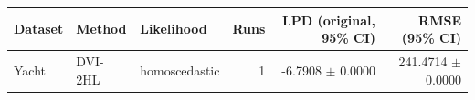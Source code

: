 \begin{tabular}{lllrrr}
\toprule
Dataset & Method & Likelihood & Runs & LPD (original, 95\% CI) & RMSE (95\% CI) \\
\midrule
Yacht & DVI-2HL & homoscedastic & 1 & -6.7908 $\pm$ 0.0000 & 241.4714 $\pm$ 0.0000 \\
\bottomrule
\end{tabular}

